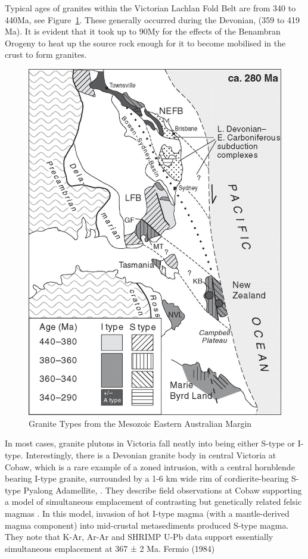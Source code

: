 \documentclass[a4paper]{article}
\begin{document}
Typical ages of granites within the Victorian Lachlan Fold Belt are from 340 to 440Ma, see  Figure~\ref{fig:GraniteTypes}. These generally occurred during the Devonian, (359 to 419 Ma). It is evident that it took up to 90My for the effects of the Benambran Orogeny to heat up the source rock enough for it to become mobilised in the crust to form granites.


\begin{figure}[H]
\centering
\includegraphics[width=1\textwidth]{Granite_Types_from_the_Eastern_Australian_Margin.jpg}
\caption{\label{fig:GraniteTypes} Granite Types from the Mesozoic Eastern Australian Margin}
\end{figure}

In most cases, granite plutons in Victoria fall neatly into being either S-type or I-type. Interestingly, there is a Devonian granite body in central Victoria at Cobaw, which is a rare example of a zoned intrusion, with a central hornblende bearing I-type granite, surrounded by a 1-6 km wide rim of cordierite-bearing S-type Pyalong Adamellite, \cite{waight2000fingerprinting}. They describe field observations at Cobaw supporting a model of simultaneous emplacement of contrasting but genetically related felsic magmas  \cite{waight2001geochemical}. In this model, invasion of hot I-type magma (with a mantle-derived magma component) into mid-crustal metasediments produced S-type magma. They note that K-Ar, Ar-Ar and SHRIMP U-Pb data support essentially simultaneous emplacement at 367 ± 2 Ma. Fermio (1984)
\end{document}
